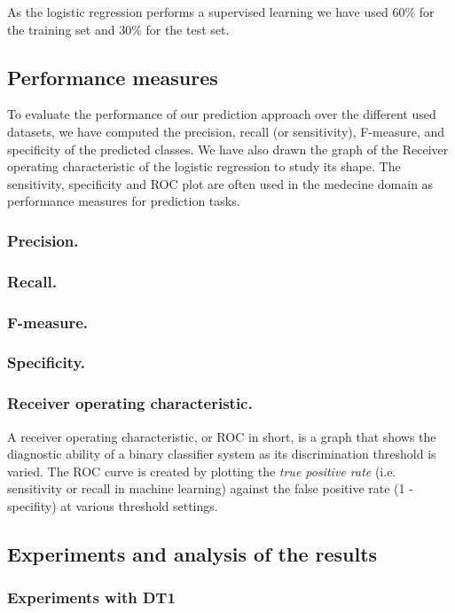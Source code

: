As the logistic regression performs a supervised learning we have used 60\% for the training set and 30\% for the test set.

\subsection{Performance measures}
To evaluate the performance of our prediction approach over the different used datasets, we have computed the precision,
recall (or sensitivity), F-measure, and specificity of the predicted classes. We have also drawn the graph of the Receiver operating 
characteristic of the logistic regression to study its shape.  
The sensitivity, specificity and ROC plot are often used in the medecine domain as performance measures for prediction tasks.

\subsubsection{Precision.}
\subsubsection{Recall.}
\subsubsection{F-measure.}
\subsubsection{Specificity.}
\subsubsection{Receiver operating characteristic.} A receiver operating characteristic, or ROC in short, is a graph
 that shows the diagnostic ability of a binary classifier system as its discrimination threshold is varied.
The ROC curve is created by plotting the \emph{true positive rate} (i.e. sensitivity or recall in machine learning) 
against the false positive rate (1 - specifity) at various threshold settings. 

\subsection{Experiments and analysis of the results}


\subsubsection{Experiments with DT1}
